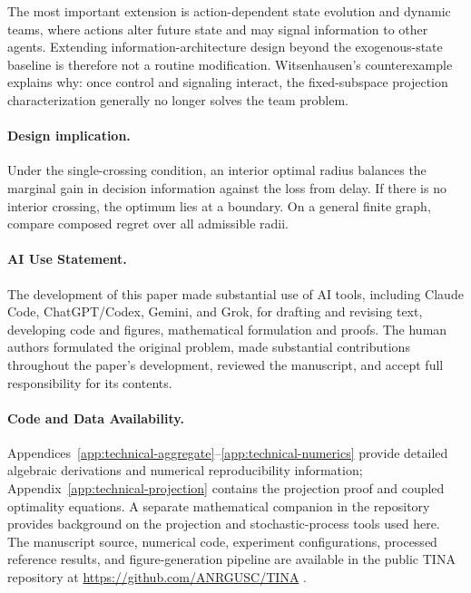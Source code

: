 \documentclass[11pt]{article}
\begin{document}
The most important extension is action-dependent state evolution and dynamic
teams, where actions alter future state and may signal information to other
agents. Extending information-architecture design beyond the exogenous-state
baseline is therefore not a routine modification.
Witsenhausen's counterexample \cite{witsenhausen1968counterexample} explains
why: once control and signaling interact, the fixed-subspace projection
characterization generally no longer solves the team problem.

\paragraph{Design implication.}
Under the single-crossing condition, an interior optimal radius balances
the marginal gain in decision information against the loss from delay.
If there is no interior crossing, the optimum lies at a boundary.
On a general finite graph,
compare composed regret over all admissible radii.

\paragraph{AI Use Statement.}
The development of this paper made substantial use of AI tools, including
Claude Code, ChatGPT/Codex, Gemini, and Grok, for drafting and revising text,
developing code and figures, mathematical formulation and proofs.
The human authors formulated the original problem, made substantial
contributions throughout the paper's development, reviewed the manuscript, and
accept full responsibility for its contents.

\paragraph{Code and Data Availability.}
Appendices~\ref{app:technical-aggregate}--\ref{app:technical-numerics} provide detailed algebraic
derivations and numerical reproducibility information;
Appendix~\ref{app:technical-projection} contains the projection proof and
coupled optimality equations. A separate mathematical
companion in the repository provides background on the projection and
stochastic-process tools used here.
The manuscript source, numerical code, experiment configurations, processed
reference results, and figure-generation pipeline are available in the public
TINA repository at \url{https://github.com/ANRGUSC/TINA}
\cite{tina2026software}.
\end{document}
